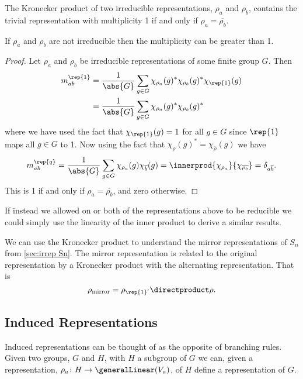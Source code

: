 \begin{crl}{}{}
    The Kronecker product of two irreducible representations, \(\rho_a\) and
    \(\rho_b\), contains the trivial representation with multiplicity 1 if and only
    if \(\rho_a = \overline{\rho_b}\).
    \begin{rmk}
        If \(\rho_a\) and \(\rho_b\) are not irreducible then the
        multiplicity can be greater than 1.
    \end{rmk}
    \begin{proof}
        Let \(\rho_a\) and \(\rho_b\) be irreducible representations of some
        finite group \(G\).
        Then
        \begin{align}
            m_{ab}^{\rep{1}} &= \frac{1}{\abs{G}} \sum_{g \in G}
            \chi_{\rho_a}(g)^* \chi_{\rho_b}(g)^*\chi_{\rep{1}}(g)\\
            &= \frac{1}{\abs{G}} \sum_{g \in G} \chi_{\rho_a}(g)^*
            \chi_{\rho_b}(g)^*
        \end{align}
        where we have used the fact that \(\chi_{\rep{1}}(g) = 1\) for all
        \(g \in G\) since \(\rep{1}\) maps all \(g \in G\) to 1.
        Now using the fact that \(\chi_{\rho}(g)^* =
        \chi_{\overline{\rho}}(g)\) we have
        \begin{equation}
            m_{ab}^{\rep{q}} = \frac{1}{\abs{G}}\sum_{g \in G}
            \chi_{\rho_a}(g)\chi_{\overline{b}}(g) =
            \innerprod{\chi_{\rho_a}}{\chi_{\overline{\rho_b}}} = \delta_{a\overline{b}}.
        \end{equation}
        This is 1 if and only if \(\rho_{a} = \overline{\rho_b}\), and zero
        otherwise.
    \end{proof}
\end{crl}

If instead we allowed on or both of the representations above to be
reducible we could simply use the linearity of the inner product to derive a
similar results.

We can use the Kronecker product to understand the mirror representations of
\(S_n\) from \cref{sec:irrep Sn}.
The mirror representation is related to the original representation by a
Kronecker product with the alternating representation.
That is
\begin{equation}
    \rho_{\mathrm{mirror}} = \rho_{\rep{1}'} \directproduct \rho.
\end{equation}

\subsection{Induced Representations}
Induced representations can be thought of as the opposite of branching
rules.
Given two groups, \(G\) and \(H\), with \(H\) a subgroup of \(G\) we can,
given a representation, \(\rho_a \colon H \to \generalLinear(V_a)\), of \(H\)
define a representation of \(G\).

